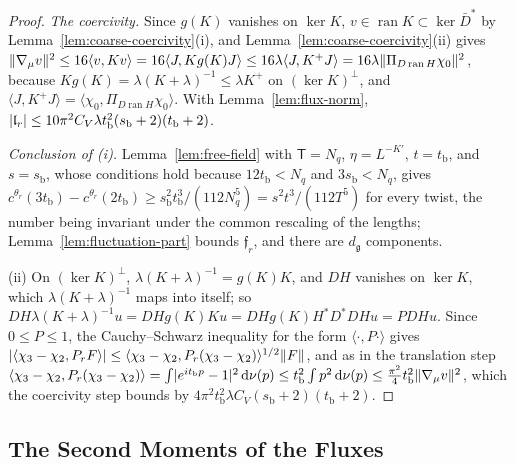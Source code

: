 \documentclass[11pt]{preprint}
\newcommand{\dd}{\mathrm{d}}
\DeclarePairedDelimiter{\abs}{\lvert}{\rvert}
\DeclarePairedDelimiter{\norm}{\lVert}{\rVert}
\numberwithin{equation}{section}
\theoremstyle{definition}
\theoremstyle{remark}
\theoremstyle{plain}
\begin{document}
\begin{proof}
\emph{The coercivity.} Since $g(K)$ vanishes on $\ker K$, $v \in \operatorname{ran}K \subset \ker\bar D^*$ by Lemma~\ref{lem:coarse-coercivity}(i), and Lemma~\ref{lem:coarse-coercivity}(ii) gives $\norm{\nabla_\mu v}^2 \leq 16\langle v, Kv\rangle = 16\langle J, Kg(K)J\rangle \leq 16\lambda\langle J, K^+J\rangle = 16\lambda\norm{\Pi_{D\operatorname{ran}H}\chi_0}^2$, because $Kg(K) = \lambda(K + \lambda)^{-1} \leq \lambda K^+$ on $(\ker K)^\perp$, and $\langle J, K^+J\rangle = \langle\chi_0, \Pi_{D\operatorname{ran}H}\chi_0\rangle$. With Lemma~\ref{lem:flux-norm}, $\abs{\mathfrak l_r} \leq 10\pi^2C_V\lambda t_{\mathrm b}^2(s_{\mathrm b} + 2)(t_{\mathrm b} + 2)$.

\emph{Conclusion of (i).} Lemma~\ref{lem:free-field} with $\mathsf T = N_q$, $\eta = L^{-K'}$, $t = t_{\mathrm b}$, and $s = s_{\mathrm b}$, whose conditions hold because $12t_{\mathrm b} < N_q$ and $3s_{\mathrm b} < N_q$, gives $c^{\theta_r}(3t_{\mathrm b}) - c^{\theta_r}(2t_{\mathrm b}) \geq s_{\mathrm b}^2t_{\mathrm b}^3/(112N_q^5) = s^2t^3/(112T^5)$ for every twist, the number being invariant under the common rescaling of the lengths; Lemma~\ref{lem:fluctuation-part} bounds $\mathfrak f_r$, and there are $d_{\mathfrak g}$ components.

(ii) On $(\ker K)^\perp$, $\lambda(K + \lambda)^{-1} = g(K)K$, and $DH$ vanishes on $\ker K$, which $\lambda(K + \lambda)^{-1}$ maps into itself; so $DH\lambda(K + \lambda)^{-1}u = DHg(K)Ku = DHg(K)H^*D^*DHu = PDHu$. Since $0 \leq P \leq 1$, the Cauchy--Schwarz inequality for the form $\langle\cdot, P\cdot\rangle$ gives $\abs{\langle\chi_3 - \chi_2, P_rF\rangle} \leq \langle\chi_3 - \chi_2, P_r(\chi_3 - \chi_2)\rangle^{1/2}\norm F$, and as in the translation step $\langle\chi_3 - \chi_2, P_r(\chi_3 - \chi_2)\rangle = \int\abs{e^{it_{\mathrm b}p} - 1}^2\,\dd\nu(p) \leq t_{\mathrm b}^2\int p^2\,\dd\nu(p) \leq \frac{\pi^2}4t_{\mathrm b}^2\norm{\nabla_\mu v}^2$, which the coercivity step bounds by $4\pi^2t_{\mathrm b}^2\lambda C_V(s_{\mathrm b} + 2)(t_{\mathrm b} + 2)$.
\end{proof}

\subsection{The Second Moments of the Fluxes}\label{sec:flux-moments}
\end{document}
